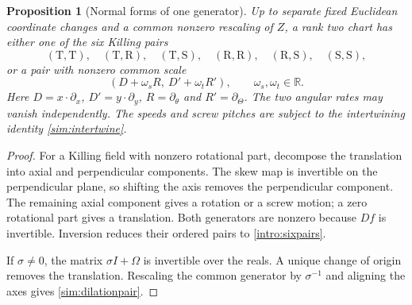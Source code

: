 \documentclass[11pt,a4paper]{article}
\numberwithin{equation}{section}
\theoremstyle{plain}
\newtheorem{proposition}[theorem]{Proposition}
\theoremstyle{definition}
\theoremstyle{remark}
\begin{document}
\begin{proposition}[Normal forms of one generator]\label{sim:types}
Up to separate fixed Euclidean coordinate changes and a common
nonzero rescaling of $Z$, a rank two chart has either one of the
six Killing pairs
\begin{equation}\label{intro:sixpairs}
(\mathrm T,\mathrm T),\quad(\mathrm T,\mathrm R),\quad
(\mathrm T,\mathrm S),\quad(\mathrm R,\mathrm R),\quad
(\mathrm R,\mathrm S),\quad(\mathrm S,\mathrm S),
\end{equation}
or a pair with nonzero common scale
\begin{equation}\label{sim:dilationpair}
(D+\omega_sR,\ D'+\omega_tR'),\qquad
\omega_s,\omega_t\in\mathbb R.
\end{equation}
Here $D=x\cdot\partial_x$, $D'=y\cdot\partial_y$,
$R=\partial_\theta$ and $R'=\partial_\Theta$.
The two angular rates may vanish independently. The speeds and
screw pitches are subject to the intertwining identity
\eqref{sim:intertwine}.
\end{proposition}
\begin{proof}
For a Killing field with nonzero rotational part, decompose the
translation into axial and perpendicular components. The skew map
is invertible on the perpendicular plane, so shifting the axis
removes the perpendicular component. The remaining axial component
gives a rotation or a screw motion; a zero rotational part gives a
translation. Both generators are nonzero because $Df$ is invertible.
Inversion reduces their ordered pairs to \eqref{intro:sixpairs}.

If $\sigma\ne0$, the matrix $\sigma I+\Omega$ is invertible over
the reals. A unique change of origin removes the translation.
Rescaling the common generator by $\sigma^{-1}$ and aligning the
axes gives \eqref{sim:dilationpair}.
\end{proof}
\end{document}
